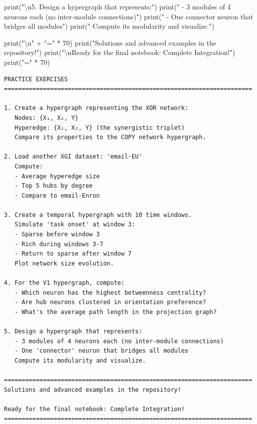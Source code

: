 \documentclass[
  11pt,
  letterpaper,
  oneside,
  openany]{book}
\newenvironment{Shaded}{\begin{snugshade}}{\end{snugshade}}
\newcommand{\BuiltInTok}[1]{\textcolor[rgb]{0.00,0.23,0.31}{#1}}
\newcommand{\CharTok}[1]{\textcolor[rgb]{0.13,0.47,0.30}{#1}}
\newcommand{\DecValTok}[1]{\textcolor[rgb]{0.68,0.00,0.00}{#1}}
\newcommand{\NormalTok}[1]{\textcolor[rgb]{0.00,0.23,0.31}{#1}}
\newcommand{\OperatorTok}[1]{\textcolor[rgb]{0.37,0.37,0.37}{#1}}
\newcommand{\StringTok}[1]{\textcolor[rgb]{0.13,0.47,0.30}{#1}}
\begin{document}
\begin{Shaded}
\begin{Highlighting}[]
\BuiltInTok{print}\NormalTok{(}\StringTok{"}\CharTok{\textbackslash{}n}\StringTok{5. Design a hypergraph that represents:"}\NormalTok{)}
\BuiltInTok{print}\NormalTok{(}\StringTok{"   {-} 3 modules of 4 neurons each (no inter{-}module connections)"}\NormalTok{)}
\BuiltInTok{print}\NormalTok{(}\StringTok{"   {-} One \textquotesingle{}connector\textquotesingle{} neuron that bridges all modules"}\NormalTok{)}
\BuiltInTok{print}\NormalTok{(}\StringTok{"   Compute its modularity and visualize."}\NormalTok{)}

\BuiltInTok{print}\NormalTok{(}\StringTok{"}\CharTok{\textbackslash{}n}\StringTok{"} \OperatorTok{+} \StringTok{"="} \OperatorTok{*} \DecValTok{70}\NormalTok{)}
\BuiltInTok{print}\NormalTok{(}\StringTok{"Solutions and advanced examples in the repository!"}\NormalTok{)}
\BuiltInTok{print}\NormalTok{(}\StringTok{"}\CharTok{\textbackslash{}n}\StringTok{Ready for the final notebook: Complete Integration!"}\NormalTok{)}
\BuiltInTok{print}\NormalTok{(}\StringTok{"="} \OperatorTok{*} \DecValTok{70}\NormalTok{)}
\end{Highlighting}
\end{Shaded}

\begin{verbatim}
PRACTICE EXERCISES
======================================================================

1. Create a hypergraph representing the XOR network:
   Nodes: {X₁, X₂, Y}
   Hyperedge: {X₁, X₂, Y} (the synergistic triplet)
   Compare its properties to the COPY network hypergraph.

2. Load another XGI dataset: 'email-EU'
   Compute:
   - Average hyperedge size
   - Top 5 hubs by degree
   - Compare to email-Enron

3. Create a temporal hypergraph with 10 time windows.
   Simulate 'task onset' at window 3:
   - Sparse before window 3
   - Rich during windows 3-7
   - Return to sparse after window 7
   Plot network size evolution.

4. For the V1 hypergraph, compute:
   - Which neuron has the highest betweenness centrality?
   - Are hub neurons clustered in orientation preference?
   - What's the average path length in the projection graph?

5. Design a hypergraph that represents:
   - 3 modules of 4 neurons each (no inter-module connections)
   - One 'connector' neuron that bridges all modules
   Compute its modularity and visualize.

======================================================================
Solutions and advanced examples in the repository!

Ready for the final notebook: Complete Integration!
======================================================================
\end{verbatim}
\end{document}
